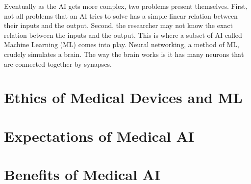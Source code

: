 \documentclass[]{article}
\begin{document}
		Eventually as the AI gets more complex, two problems present themselves. First, not all problems that an AI tries to solve has a simple linear relation between their inputs and the output. Second, the researcher may not know the exact relation between the inputs and the output. This is where a subset of AI called Machine Learning (ML) comes into play. Neural networking, a method of ML, crudely simulates a brain. The way the brain works is it has many neurons that are connected together by synapses.



		

	\section{Ethics of Medical Devices and ML}\label{ethics}

	\section{Expectations of Medical AI}

	\section{Benefits of Medical AI}
\end{document}
